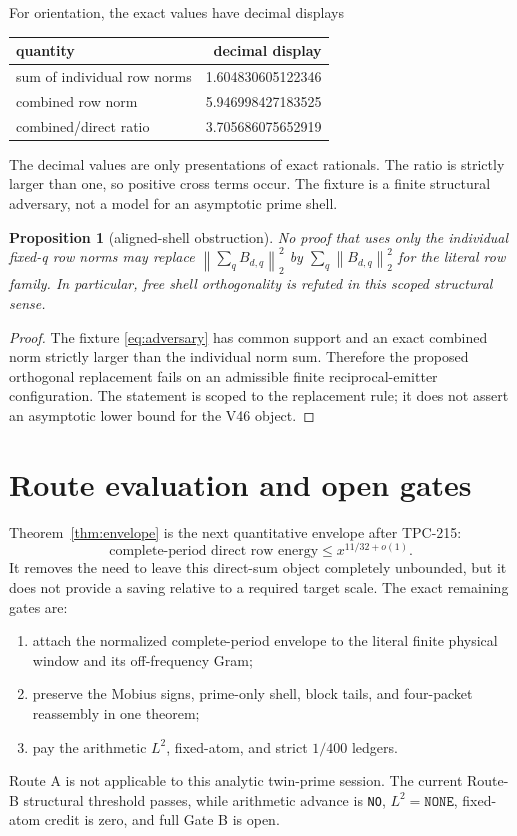 \documentclass[11pt]{article}
\newtheorem{proposition}[theorem]{Proposition}
\theoremstyle{definition}
\theoremstyle{remark}
\newcommand{\norm}[1]{\left\lVert #1\right\rVert}
\begin{document}
For orientation, the exact values have decimal displays
\begin{center}
\begin{tabular}{@{}lr@{}}
\toprule
quantity & decimal display \\
\midrule
sum of individual row norms & 1.604830605122346 \\
combined row norm & 5.946998427183525 \\
combined/direct ratio & 3.705686075652919 \\
\bottomrule
\end{tabular}
\end{center}
The decimal values are only presentations of exact rationals.  The ratio is
strictly larger than one, so positive cross terms occur.  The fixture is a
finite structural adversary, not a model for an asymptotic prime shell.

\begin{proposition}[aligned-shell obstruction]
\label{prop:adversary}
No proof that uses only the individual fixed-q row norms may replace
\(\norm{\sum_qB_{d,q}}_2^2\) by \(\sum_q\norm{B_{d,q}}_2^2\) for the literal row
family.  In particular, free shell orthogonality is refuted in this scoped
structural sense.
\end{proposition}

\begin{proof}
The fixture \eqref{eq:adversary} has common support and an exact combined norm
strictly larger than the individual norm sum.  Therefore the proposed
orthogonal replacement fails on an admissible finite reciprocal-emitter
configuration.  The statement is scoped to the replacement rule; it does not
assert an asymptotic lower bound for the V46 object.
\end{proof}

\section{Route evaluation and open gates}

Theorem~\ref{thm:envelope} is the next quantitative envelope after TPC-215:
\begin{equation}
 \text{complete-period direct row energy}
 \le x^{11/32+o(1)}.
 \label{eq:route-advance}
\end{equation}
It removes the need to leave this direct-sum object completely unbounded, but
it does not provide a saving relative to a required target scale.  The exact
remaining gates are:
\begin{enumerate}[leftmargin=2em]
 \item attach the normalized complete-period envelope to the literal finite
       physical window and its off-frequency Gram;
 \item preserve the Mobius signs, prime-only shell, block tails, and four-packet
       reassembly in one theorem;
 \item pay the arithmetic \(L^2\), fixed-atom, and strict \(1/400\) ledgers.
\end{enumerate}
Route A is not applicable to this analytic twin-prime session.  The current
Route-B structural threshold passes, while arithmetic advance is
\texttt{NO}, \(L^2=\texttt{NONE}\), fixed-atom credit is zero, and full Gate B
is open.
\end{document}
